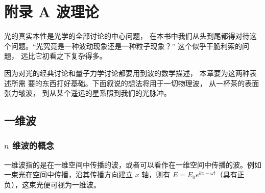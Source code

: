\documentclass[UTF8]{report}
\theoremstyle{MyLineTheoremStyle} %
\theoremstyle{MyBlockTheoremStyle} %
\theoremstyle{MySubsubsectionStyle} %
\begin{document}


\newpage
\appendix
\titleformat{\chapter}[hang]{\normalfont\huge\bfseries\centering}{}{20pt}{}
\titlespacing*{\chapter}{0pt}{-25pt}{8pt} %
\titleformat{\section}[hang]{\normalfont\centering\Large\bfseries}{\thesection}{8pt}{}

\chapter*{附录 A\hspace*{20pt} 波理论}
\setcounter{chapter}{1}   
\setcounter{equation}{0}    %
\thispagestyle{fancy} 
\setcounter{section}{0}
\renewcommand\thesection{A.\arabic{section}}   
\renewcommand{\thefigure}{A.\arabic{figure}} 
\renewcommand{\thetable}{A.\arabic{table}}


光的真实本性是光学的全部讨论的中心问题， 在本书中我们从头到尾都得对待这个问题。“光究竟是一种波动现象还是一种粒子现象？” 这个似乎干脆利索的问题， 远比它初看之下复杂得多。

因为对光的经典讨论和量子力学讨论都要用到波的数学描述， 本章要为这两种表述所需
要的东西打好基础。下面叙说的想法将用于一切物理波， 从一杯茶的表面张力皱波， 到从某个遥远的星系照到我们的光脉冲。

\section{一维波}

\subsection{$n$ 维波的概念}

一维波指的是在一维空间中传播的波，或者可以看作在一维空间中传播的波。例如一束光在空间中传播，沿其传播方向建立 $x$ 轴，则有 $E = E_0 e^{kx - \omega t}$（具有正负），这束光便可视为一维波。
\end{document}
